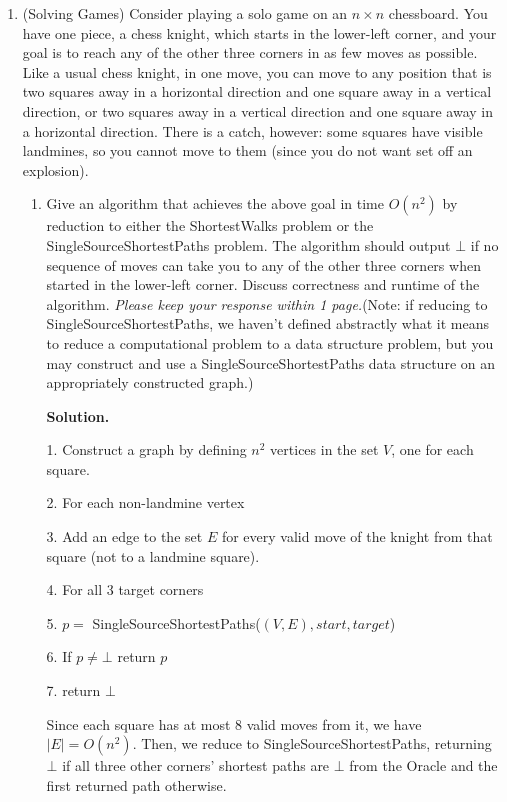 \documentclass[11pt]{article}
\newenvironment{soln}{%
  \par\medskip\noindent\begingroup\color{blue}\textbf{Solution.}\ %
}{%
  \endgroup\par\medskip%
}
\begin{document}
\begin{enumerate}
\emph{Please keep your response within 1 page.}

\item  (Solving Games) 
     Consider playing a solo game on an $n\times n$ chessboard.  You have one piece, a chess knight, which starts in the lower-left corner, and your goal is to reach any of the other three corners in as few moves as possible.  Like a usual chess knight, in one move, you can move to any position that is two squares away in a horizontal direction and one square away in a vertical direction, or two squares away in a vertical direction and one square away in a horizontal direction.  There is a catch, however: some squares have visible landmines, so you cannot move to them (since you do not want set off an explosion). \


\begin{enumerate}
\item Give an algorithm that achieves the above goal in time $O(n^2)$ by reduction to either the ShortestWalks problem or the SingleSourceShortestPaths problem. The algorithm should output $\bot$ if no sequence of moves can take you to any of the other three corners when started in the lower-left corner. Discuss correctness and runtime of the algorithm. \emph{Please keep your response within 1 page.}(Note: if reducing to SingleSourceShortestPaths, we haven't defined abstractly what it means to reduce a computational problem to a data structure problem, but you may construct and use a SingleSourceShortestPaths data structure on an appropriately constructed graph.)

\begin{soln}
	
1. Construct a graph by defining $n^2$ vertices in the set $V$, one for each square.

2. For each non-landmine vertex

3. \quad Add an edge to the set $E$ for every valid move of the knight from that square (not to a landmine square).

4. For all 3 target corners

5. \quad $p=$ SingleSourceShortestPaths($(V, E), start, target$)

6. \quad If $p\neq\bot$ return $p$

7. return $\bot$

Since each square has at most 8 valid moves from it, we have $|E|=O(n^2)$. Then, we reduce to SingleSourceShortestPaths, returning $\bot$ if all three other corners' shortest paths are $\bot$ from the Oracle and the first returned path otherwise.


\end{soln}
\end{enumerate}
\end{enumerate}
\end{document}
